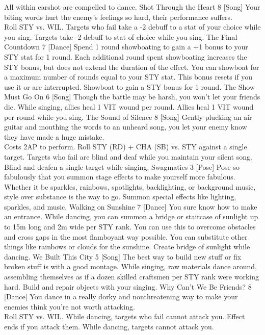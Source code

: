 \begin{path}
{All within earshot are compelled to dance.}
\skilldescription
{Shot Through the Heart}
{8}
[Song]
{Your biting words hurt the enemy's feelings so hard, their performance suffers.
\\Roll STY vs. WIL. Targets who fail take a -2 debuff to a stat of your choice while you sing.}
{Targets take -2 debuff to stat of choice while you sing.}
\skilldescription
{The Final Countdown}
{7}
[Dance]
{Spend 1 round showboating to gain a +1 bonus to your STY stat for 1 round. Each additional round spent showboating increases the STY bonus, but does not extend the duration of the effect. You can showboat for a maximum number of rounds equal to your STY stat. This bonus resets if you use it or are interrupted.}
{Showboat to gain a STY bonus for 1 round.}
\skilldescription
{The Show Must Go On}
{6}
[Song]
{Though the battle may be harsh, you won't let your friends die. While singing, allies heal 1 VIT wound per round.}
{Allies heal 1 VIT wound per round while you sing.}
\skilldescription
{The Sound of Silence}
{8}
[Song]
{Gently plucking an air guitar and mouthing the words to an unheard song, you let your enemy know they have made a huge mistake.
\\Costs 2AP to perform. Roll STY (RD) + CHA (SB) vs. STY against a single target. Targets who fail are blind and deaf while you maintain your silent song.}
{Blind and deafen a single target while singing.}
\skilldescription
{Swagmatics}
{3}
[Pose]
{Pose so fabulously that you summon stage effects to make yourself more fabulous. Whether it be sparkles, rainbows, spotlights, backlighting, or background music, style over substance is the way to go.}
{Summon special effects like lighting, sparkles, and music.}
\skilldescription
{Walking on Sunshine}
{7}
[Dance]
{You sure know how to make an entrance. While dancing, you can summon a bridge or staircase of sunlight up to 15m long and 2m wide per STY rank. You can use this to overcome obstacles and cross gaps in the most flamboyant way possible. You can substitute other things like rainbows or clouds for the sunshine.}
{Create bridge of sunlight while dancing.}
\skilldescription
{We Built This City}
{5}
[Song]
{The best way to build new stuff or fix broken stuff is with a good montage. While singing, raw materials dance around, assembling themselves as if a dozen skilled craftsmen per STY rank were working hard.}
{Build and repair objects with your singing.}
\skilldescription
{Why Can't We Be Friends?}
{8}
[Dance]
{You dance in a really dorky and nonthreatening way to make your enemies think you're not worth attacking.
\\Roll STY vs. WIL. While dancing, targets who fail cannot attack you. Effect ends if you attack them.}
{While dancing, targets cannot attack you.}

\end{path}
